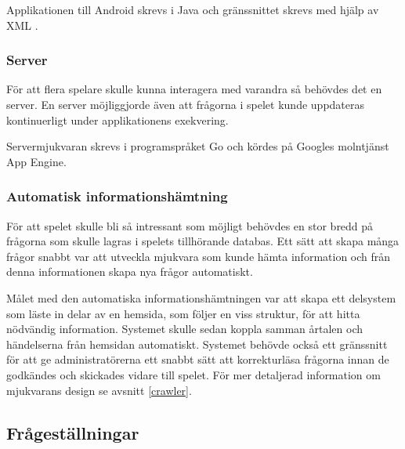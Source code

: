 \documentclass[a4paper, 11pt]{article}
\begin{document}
Applikationen till Android skrevs i Java och gränssnittet skrevs med hjälp av XML \cite{xml}. 

\subsubsection{Server}
För att flera spelare skulle kunna interagera med varandra så behövdes det en server. En server möjliggjorde även att frågorna i spelet kunde uppdateras kontinuerligt under applikationens exekvering.

Servermjukvaran skrevs i programspråket Go \cite{golang} och kördes på Googles molntjänst App Engine.

\subsubsection{Automatisk informationshämtning}
För att spelet skulle bli så intressant som möjligt behövdes en stor bredd på frågorna som skulle lagras i spelets tillhörande databas. Ett sätt att skapa många frågor snabbt var att utveckla mjukvara som kunde hämta information och från denna informationen skapa nya frågor automatiskt. 

Målet med den automatiska informationshämtningen var att skapa ett delsystem som läste in delar av en hemsida, som följer en viss struktur, för att hitta nödvändig information. Systemet skulle sedan koppla samman årtalen och händelserna från hemsidan automatiskt. Systemet behövde också ett gränssnitt för att ge administratörerna ett snabbt sätt att korrekturläsa frågorna innan de godkändes och skickades vidare till spelet. För mer detaljerad information om mjukvarans design se avsnitt \ref{crawler}.

\subsection{Frågeställningar}
\end{document}
